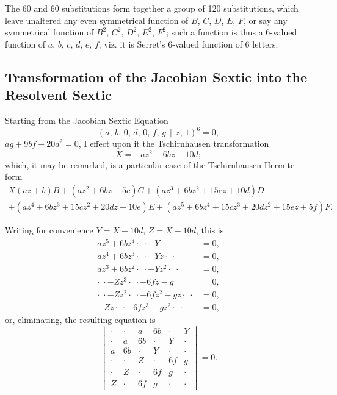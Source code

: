\documentclass[11pt,a4paper]{article}
\theoremstyle{cayley}
\begin{document}
The 60 and 60 substitutions form together a group of 120 substitutions, which leave unaltered any even symmetrical function of $B$, $C$, $D$, $E$, $F$, or say any symmetrical function of $B^{2}$, $C^{2}$, $D^{2}$, $E^{2}$, $F^{2}$; such a function is thus a 6-valued function of $a$, $b$, $c$, $d$, $e$, $f$; viz. it is Serret's 6-valued function of 6 letters.

\subsection*{Transformation of the Jacobian Sextic into the Resolvent Sextic}

Starting from the Jacobian Sextic Equation
\[
(a,\, b,\, 0,\, d,\, 0,\, f,\, g \,\!\!\mid\!\!\, z,\, 1)^{6} = 0,
\]
$ag + 9bf - 20d^{2} = 0$, I effect upon it the Tschirnhausen transformation
\[
X = -az^{2} - 6bz - 10d;
\]
which, it may be remarked, is a particular case of the Tschirnhausen-Hermite form
\begin{multline*}
X(az+b)B + (az^{2}+6bz+5c)C + (az^{3}+6bz^{2}+15cz+10d)D\\
+ (az^{4}+6bz^{3}+15cz^{2}+20dz+10e)E + (az^{5}+6bz^{4}+15cz^{3}+20dz^{2}+15ez+5f)F.
\end{multline*}

Writing for convenience $Y = X+10d$, $Z = X-10d$, this is
\begin{align*}
az^{5} + 6bz^{4} \cdot\;\cdot + Y &= 0,\\
az^{4} + 6bz^{3} \cdot\;\cdot + Yz \cdot\;\cdot &= 0,\\
az^{3} + 6bz^{2} \cdot\;\cdot + Yz^{2} \cdot\;\cdot &= 0,\\
\cdot\;\cdot - Zz^{3} \cdot\;\cdot - 6fz - g &= 0,\\
\cdot\;\cdot - Zz^{2} \cdot\;\cdot - 6fz^{2} - gz \cdot\;\cdot &= 0,\\
-Zz \cdot\;\cdot - 6fz^{3} - gz^{2} \cdot\;\cdot &= 0,
\end{align*}
or, eliminating, the resulting equation is
\[
\begin{vmatrix}
\cdot & \cdot & a & 6b & \cdot & Y \\
\cdot & a & 6b & \cdot & Y & \cdot \\
a & 6b & \cdot & Y & \cdot & \cdot \\
\cdot & \cdot & Z & \cdot & 6f & g \\
\cdot & Z & \cdot & 6f & g & \cdot \\
Z & \cdot & 6f & g & \cdot & \cdot
\end{vmatrix} = 0.
\]
\end{document}
